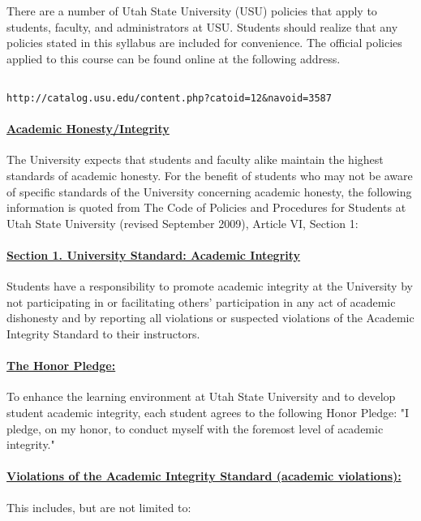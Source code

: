 \documentclass[10pt,fleqn]{article}
\begin{document}
\noindent
There are a number of Utah State University (USU) policies that apply to
students, faculty, and administrators at USU. Students should realize that any
policies stated in this syllabus are included for convenience. The official
policies applied to this course can be found online at the following address.
\begin{verbatim}

http://catalog.usu.edu/content.php?catoid=12&navoid=3587

\end{verbatim}

\paragraph{\underline{Academic Honesty/Integrity}} The University expects that
students and faculty alike maintain the highest standards of academic honesty.
For the benefit of students who may not be aware of specific standards of the
University concerning academic honesty, the following information is quoted from
The Code of Policies and Procedures for Students at Utah State University
(revised September 2009), Article VI, Section 1:

\paragraph{\underline{Section 1. University Standard: Academic Integrity}}
Students have a responsibility to promote academic integrity at the University
by not participating in or facilitating others' participation in any act of
academic dishonesty and by reporting all violations or suspected violations of
the Academic Integrity Standard to their instructors.

\paragraph{\underline{The Honor Pledge:}} To enhance the learning environment at
Utah State University and to develop student academic integrity, each student
agrees to the following Honor Pledge: "I pledge, on my honor, to conduct myself
with the foremost level of academic integrity."

\paragraph{\underline{Violations of the Academic Integrity Standard (academic
violations):}} This includes, but are not limited to:
\end{document}
